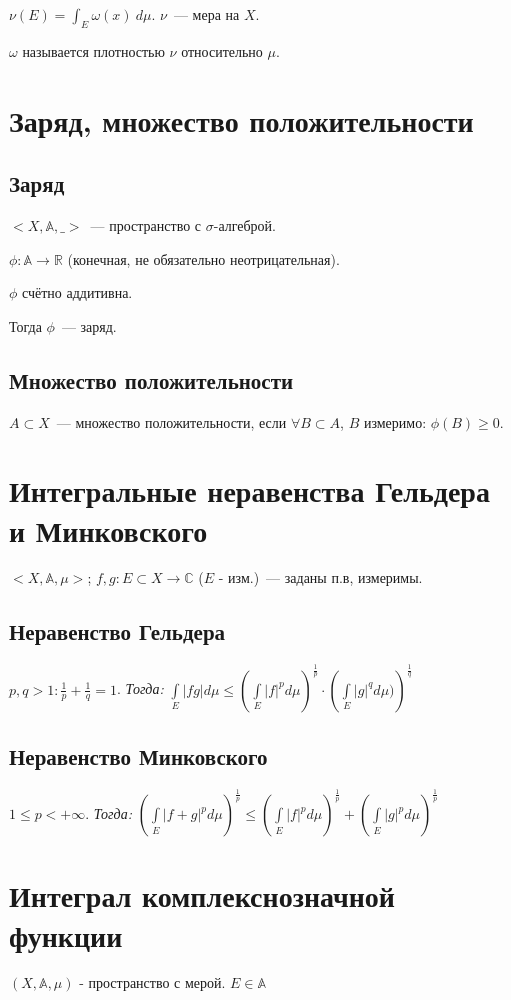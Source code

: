 \documentclass[paper=a4, fontsize=14pt]{report}
\begin{document}
$\nu(E) = \int_E \omega(x)~d\mu$. $\nu$~--- мера на $X$.

$\omega$ называется плотностью $\nu$ относительно $\mu$.

\section{Заряд, множество положительности}
\subsection{Заряд}
$<X, \mathds{A}, \_>$~--- пространство с $\sigma$-алгеброй.

$\phi: \mathds{A} \to \mathds{R}$ (конечная, не обязательно неотрицательная).

$\phi$ счётно аддитивна.

Тогда $\phi$~--- заряд.

\subsection{Множество положительности}
$A \subset X$~--- множество положительности, если
$\forall B \subset A$, $B$ измеримо: $\phi(B) \geq 0$.

\section{Интегральные неравенства Гельдера и Минковского}
$<X, \mathds{A}, \mu>$; $f, g : E \subset X \rightarrow \mathds{C}$ ($E$ - изм.)~--- заданы п.в, измеримы.\\
\subsection{Неравенство Гельдера}
$p, q > 1 : \frac{1}{p} + \frac{1}{q} = 1$.
\emph{Тогда:}
${\displaystyle \int\limits_E |fg|d\mu \leq \left(\int\limits_E |f|^p d\mu\right)^\frac{1}{p} \cdot \left(\int\limits_E |g|^q d\mu)\right)^\frac{1}{q}}$
\subsection{Неравенство Минковского}
$1 \leq p < +\infty$.
\emph{Тогда:}
${\displaystyle \left(\int\limits_E |f + g|^p d\mu \right)^\frac{1}{p}
    \leq \left(\int\limits_E |f|^p d\mu\right)^\frac{1}{p}
    + \left(\int\limits_E |g|^p d\mu\right)^\frac{1}{p}}$

\section{Интеграл комплекснозначной функции}
$(X, \mathds{A}, \mu)$ - пространство с мерой. $E \in \mathds{A}$
\end{document}
